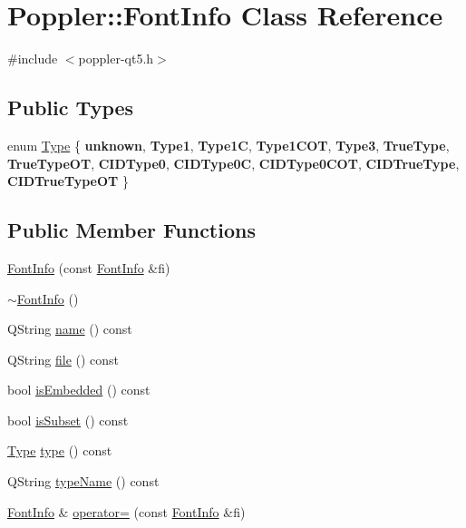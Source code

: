 \hypertarget{class_poppler_1_1_font_info}{}\section{Poppler\+:\+:Font\+Info Class Reference}
\label{class_poppler_1_1_font_info}


{\ttfamily \#include $<$poppler-\/qt5.\+h$>$}

\subsection*{Public Types}
\begin{DoxyCompactItemize}
\item 
enum \hyperlink{class_poppler_1_1_font_info_a98fc6abbc1e3583d68751bd431e297ab}{Type} \{ \newline
{\bfseries unknown}, 
{\bfseries Type1}, 
{\bfseries Type1C}, 
{\bfseries Type1\+C\+OT}, 
\newline
{\bfseries Type3}, 
{\bfseries True\+Type}, 
{\bfseries True\+Type\+OT}, 
{\bfseries C\+I\+D\+Type0}, 
\newline
{\bfseries C\+I\+D\+Type0C}, 
{\bfseries C\+I\+D\+Type0\+C\+OT}, 
{\bfseries C\+I\+D\+True\+Type}, 
{\bfseries C\+I\+D\+True\+Type\+OT}
 \}
\end{DoxyCompactItemize}
\subsection*{Public Member Functions}
\begin{DoxyCompactItemize}
\item 
\hyperlink{class_poppler_1_1_font_info_a53208547826cd7ac75458c83c23bb1e1}{Font\+Info} (const \hyperlink{class_poppler_1_1_font_info}{Font\+Info} \&fi)
\item 
\hyperlink{class_poppler_1_1_font_info_ab3d980a3eb88722a36c9b26e8940b265}{$\sim$\+Font\+Info} ()
\item 
Q\+String \hyperlink{class_poppler_1_1_font_info_aee13f37dc29e952ebb712edc28247e27}{name} () const
\item 
Q\+String \hyperlink{class_poppler_1_1_font_info_ac2dd960151b4929422accadc16fa7f2b}{file} () const
\item 
bool \hyperlink{class_poppler_1_1_font_info_a6fb2d7f19b80a5433d6c5003ed316234}{is\+Embedded} () const
\item 
bool \hyperlink{class_poppler_1_1_font_info_a35849a9cbae919be0bf7fcc081a81a21}{is\+Subset} () const
\item 
\hyperlink{class_poppler_1_1_font_info_a98fc6abbc1e3583d68751bd431e297ab}{Type} \hyperlink{class_poppler_1_1_font_info_aca229fe40069fabdf4b9d3bc58e50c32}{type} () const
\item 
Q\+String \hyperlink{class_poppler_1_1_font_info_afe24dd8e3a04e0cc6be1d97f7c4d354f}{type\+Name} () const
\item 
\hyperlink{class_poppler_1_1_font_info}{Font\+Info} \& \hyperlink{class_poppler_1_1_font_info_a2fc7db3aef886a68432ebc0adcd256d9}{operator=} (const \hyperlink{class_poppler_1_1_font_info}{Font\+Info} \&fi)
\end{DoxyCompactItemize}
